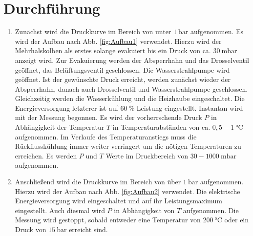 
\section{Durchführung}
\label{sec:Durchführung}

\renewcommand{\labelenumi}{\alph{enumi})}
\begin{enumerate}
  \item Zunächst wird die Druckkurve im Bereich von unter $\SI{1}{\bar}$ aufgenommen.
   Es wird der Aufbau nach Abb. \ref{fig:Aufbau1} verwendet.
  Hierzu wird der Mehrhalskolben als erstes solange evakuiert bis ein
  Druck von ca. $\SI{30}{\milli\bar}$ anzeigt wird. Zur Evakuierung werden der
   Absperrhahn und das Drosselventil geöffnet, das Belüftungsventil geschlossen.
    Die Wasserstrahlpumpe wird geöffnet.
    Ist der gewünschte Druck erreicht, werden zunächst wieder der Absperrhahn,
     danach auch Drosselventil und Wasserstrahlpumpe geschlossen. Gleichzeitig
     werden die Wasserkühlung und die Heizhaube eingeschaltet. Die Energieversorgung
     letzterer ist auf $\SI{60}{\percent}$ Leistung eingestellt. Instantan wird mit
      der Messung begonnen. Es wird der vorherrschende Druck $P$ in Abhängigkeit der Temperatur
       $T$ in Temperaturabständen von ca. $0,5- \SI{1}{\degreeCelsius}$ aufgenommen.
       Im Verlaufe des Temperaturanstiegs muss die Rückflusskühlung immer weiter
        verringert um die nötigen Temperaturen zu erreichen. Es werden $P$ und $T$
         Werte im Druckbereich von $30- \SI{1000}{\milli\bar}$ aufgenommen.

         \item Anschließend wird die Druckkurve im Bereich von über $\SI{1}{\bar}$
          aufgenommen. Hierzu wird der Aufbau nach Abb. \ref{fig:Aufbau2} verwendet. Die
           elektrische Energieversorgung wird eingeschaltet und auf ihr Leistungsmaximum
            eingestellt. Auch diesmal wird $P$ in Abhängigkeit von $T$ aufgenommen.
             Die Messung wird gestoppt, sobald entweder eine Temperatur von $\SI{200}{\degreeCelsius}$
              oder ein Druck von $\SI{15}{\bar}$ erreicht sind.
\end{enumerate}
